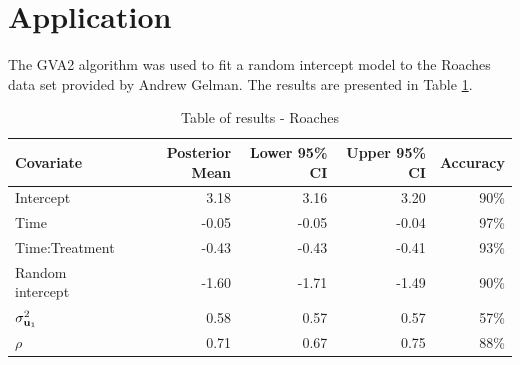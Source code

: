 \documentclass{article}[12pt]
\begin{document}
\section{Application}
\label{sec:application}


The GVA2 algorithm was used to fit a random intercept model to the Roaches data set provided by Andrew Gelman.
The results are presented in Table \ref{tab:application_roaches}.



\begin{table}
\caption{Table of results - Roaches}
\label{tab:application_roaches}
\begin{tabular}{|l|rrrr|}
\hline
Covariate & Posterior Mean & Lower 95\% CI & Upper 95\% CI & Accuracy \\
\hline
Intercept & 3.18 & 3.16 & 3.20 & 90\% \\
Time & -0.05 & -0.05 & -0.04 & 97\% \\
Time:Treatment & -0.43 & -0.43 & -0.41 & 93\% \\
Random intercept & -1.60 & -1.71 & -1.49 & 90\% \\
$\sigma^2_{{\bf u}_1}$ & 0.58 & 0.57 & 0.57 & 57\% \\
$\rho$ & 0.71 & 0.67 & 0.75 & 88\% \\
\hline
\end{tabular}
\end{table}
\end{document}
